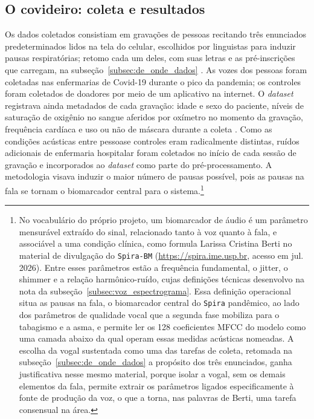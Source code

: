 \subsection{O covideiro: coleta e resultados}
\label{subsec:covideiro_coleta}

Os dados coletados consistiam em gravações de pessoas recitando três enunciados predeterminados lidos na tela do celular, escolhidos por linguistas para induzir pausas respiratórias; retomo cada um deles, com suas letras e as pré-inscrições que carregam, na subseção~\ref{subsec:de_onde_dados} \parencite{Casanova2021DeepLearning}. As vozes dos pessoas foram coletadas nas enfermarias de Covid-19 durante o pico da pandemia; os controles foram coletados de doadores por meio de um aplicativo na internet. O \textit{dataset} registrava ainda metadados de cada gravação: idade e sexo do paciente, níveis de saturação de oxigênio no sangue aferidos por oxímetro no momento da gravação, frequência cardíaca e uso ou não de máscara durante a coleta \parencite{Gauy2024Discriminant}. Como as condições acústicas entre pessoase controles eram radicalmente distintas, ruídos adicionais de enfermaria hospitalar foram coletados no início de cada sessão de gravação e incorporados ao \textit{dataset} como parte do pré-processamento. A metodologia visava induzir o maior número de pausas possível, pois as pausas na fala se tornam o biomarcador central para o sistema.\footnote{No vocabulário do próprio projeto, um biomarcador de áudio é um parâmetro mensurável extraído do sinal, relacionado tanto à voz quanto à fala, e associável a uma condição clínica, como formula Larissa Cristina Berti no material de divulgação do \texttt{Spira-BM} (\url{https://spira.ime.usp.br}, acesso em jul. 2026). Entre esses parâmetros estão a frequência fundamental, o jitter, o shimmer e a relação harmônico-ruído, cujas definições técnicas desenvolvo na nota da subseção~\ref{subsec:voz_espectrograma}. Essa definição operacional situa as pausas na fala, o biomarcador central do \texttt{Spira} pandêmico, ao lado dos parâmetros de qualidade vocal que a segunda fase mobiliza para o tabagismo e a asma, e permite ler os 128 coeficientes MFCC do modelo como uma camada abaixo da qual operam essas medidas acústicas nomeadas. A escolha da vogal sustentada como uma das tarefas de coleta, retomada na subseção~\ref{subsec:de_onde_dados} a propósito dos três enunciados, ganha justificativa nesse mesmo material, porque isolar a vogal, sem os demais elementos da fala, permite extrair os parâmetros ligados especificamente à fonte de produção da voz, o que a torna, nas palavras de Berti, uma tarefa consensual na área.}

